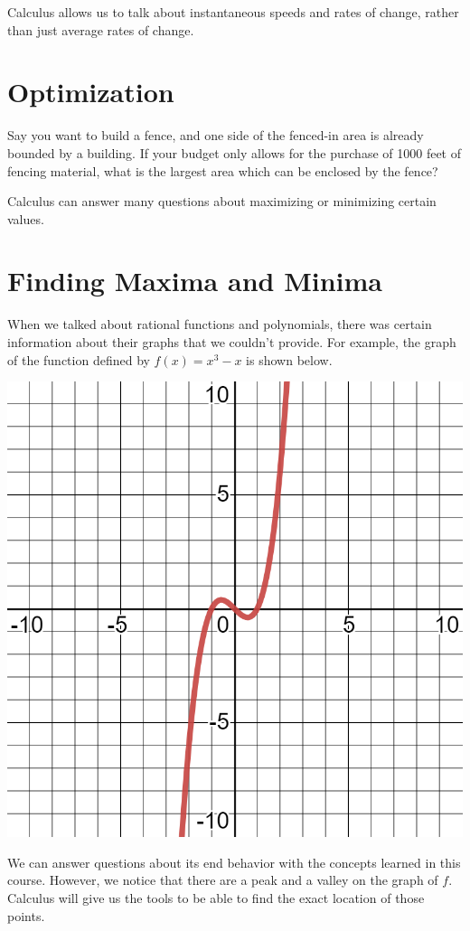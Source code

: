 \documentclass{ximera}
\begin{document}
Calculus allows us to talk about instantaneous speeds and rates of change, rather than just average rates of change. 

\section{Optimization}
Say you want to build a fence, and one side of the fenced-in area is already bounded by a building. If your budget only allows for the purchase of 1000 feet of fencing material, what is the largest area which can be enclosed by the fence?

Calculus can answer many questions about maximizing or minimizing certain values. 

\section{Finding Maxima and Minima}
When we talked about rational functions and polynomials, there was certain information about their graphs that we couldn't provide. For example, the graph of the function defined by $f(x) = x^3 - x$ is shown below.

\begin{image}
\includegraphics[width=0.8\linewidth]{x-cubed-minus-x.png}
\end{image}

We can answer questions about its end behavior with the concepts learned in this course. However, we notice that there are a peak and a valley on the graph of $f$. Calculus will give us the tools to be able to find the exact location of those points. 
\end{document}
